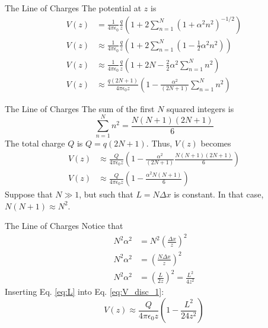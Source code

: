 \documentclass{beamer}
\begin{document}
\begin{frame}{The Line of Charges}
The potential at $z$ is
\begin{align}
V(z) &= \frac{1}{4\pi\epsilon_0} \frac{q}{z}\left( 1 + 2 \sum_{n=1}^{N} (1 + \alpha^2 n^2)^{-1/2} \right) \\
V(z) &\approx \frac{1}{4\pi\epsilon_0} \frac{q}{z}\left( 1 + 2 \sum_{n=1}^{N} \left(1 - \frac{1}{2} \alpha^2 n^2 \right) \right) \\
V(z) &\approx \frac{1}{4\pi\epsilon_0} \frac{q}{z}\left( 1 + 2N - \frac{2}{2} \alpha^2 \sum_{n=1}^N n^2 \right)  \\
V(z) &\approx \frac{q(2N+1)}{4\pi\epsilon_0 z}\left( 1 - \frac{\alpha^2}{(2N+1)} \sum_{n=1}^N n^2 \right)
\end{align}
\end{frame}

\begin{frame}{The Line of Charges}
The sum of the first $N$ squared integers is
\begin{equation}
\sum_{n=1}^{N} n^2 = \frac{N(N+1)(2N+1)}{6}
\end{equation}
The total charge $Q$ is $Q = q(2N+1)$.  Thus, $V(z)$ becomes
\begin{align}
V(z) &\approx \frac{Q}{4\pi\epsilon_0 z}\left( 1 - \frac{\alpha^2}{(2N+1)} \frac{N(N+1)(2N+1)}{6} \right) \\
V(z) &\approx \frac{Q}{4\pi\epsilon_0 z}\left( 1 - \frac{\alpha^2 N(N+1)}{6} \right) \label{eq:V_disc_1}
\end{align}
Suppose that $N \gg 1$, but such that $L = N\Delta x$ is constant.  In that case, $N(N+1) \approx N^2$.
\end{frame}

\begin{frame}{The Line of Charges}
Notice that
\begin{align}
N^2 \alpha^2 &= N^2 \left( \frac{\Delta x}{z} \right)^2 \\
N^2 \alpha^2 &= \left( \frac{N \Delta x}{z} \right)^2 \\
N^2 \alpha^2 &= \left( \frac{L}{2z} \right)^2 = \frac{L^2}{4 z^2} \label{eq:L}
\end{align}
Inserting Eq. \ref{eq:L} into Eq. \ref{eq:V_disc_1}:
\begin{equation}
V(z) \approx \frac{Q}{4\pi\epsilon_0 z}\left( 1 - \frac{L^2}{24 z^2} \right)
\end{equation}
\end{frame}
\end{document}
